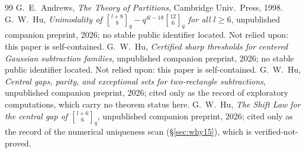 \documentclass[11pt,reqno]{article}
\theoremstyle{definition}
\newcommand{\ggbrack}[2]{\genfrac{[}{]}{0pt}{}{#1}{#2}_q}
\begin{document}
\begin{thebibliography}{99}
 G.\ E.\ Andrews, \emph{The Theory of Partitions}, Cambridge Univ.\ Press, 1998.
 G.\ W.\ Hu, \emph{Unimodality of $\ggbrack{l+8}{8}-q^{4l-18}\ggbrack{12}{6}$ for all $l\ge6$}, unpublished companion preprint, 2026; no stable public identifier located. Not relied upon: this paper is self-contained.
 G.\ W.\ Hu, \emph{Certified sharp thresholds for centered Gaussian subtraction families}, unpublished companion preprint, 2026; no stable public identifier located. Not relied upon: this paper is self-contained.
 G.\ W.\ Hu, \emph{Central gaps, parity, and exceptional sets for two-rectangle subtractions}, unpublished companion preprint, 2026; cited only as the record of exploratory computations, which carry no theorem status here.
 G.\ W.\ Hu, \emph{The Shift Law for the central gap of $\ggbrack{l+6}{6}$}, unpublished companion preprint, 2026; cited only as the record of the numerical uniqueness scan (\S\ref{sec:why15}), which is verified-not-proved.
\end{thebibliography}
\end{document}

